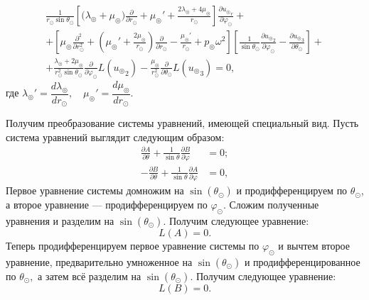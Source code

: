\begin{equation}\label{eq_3.1}
\begin{split}
\frac{1}{r_\odot\sin\theta_\odot}\left[\biggl(\lambda_\circledcirc+\mu_\circledcirc\biggr)\frac{\partial}{\partial r_\odot} + \mu_\circledcirc' + \frac{2\lambda_\circledcirc+4\mu_\circledcirc}{r_\odot}\right]\frac{\partial {u_\circledcirc}_r}{\partial\varphi_\odot} +\\
+ \left[\mu_\circledcirc\frac{\partial^2}{\partial r_\odot^2} + \left(\mu_\circledcirc'+\frac{2\mu_\circledcirc}{r_\odot}\right)\frac{\partial}{\partial r_\odot} - \frac{\mu_\circledcirc'}{r_\odot} + p_\circledcirc\omega^2\right]\left[\frac{1}{\sin\theta_\odot}\frac{\partial {u_\circledcirc}_2}{\partial\varphi_\odot} - \frac{\partial {u_\circledcirc}_3}{\partial\theta_\odot}\right] +\\
+ \frac{\lambda_\circledcirc+2\mu_\circledcirc}{r_\odot^2\sin\theta_\odot}\frac{\partial}{\partial \varphi_\odot}L({u_\circledcirc}_2) -\frac{\mu_\circledcirc}{r_\odot^2}\frac{\partial}{\partial\theta_\odot}L({u_\circledcirc}_3) = 0,
\end{split}
\end{equation}
где $\lambda_\circledcirc' = \dfrac{ d \!\lambda_\circledcirc}{ d \! r_\odot},\quad\mu_\circledcirc' = \dfrac{ d \!\mu_\circledcirc}{ d \! r_\odot}.$

Получим преобразование системы уравнений, имеющей специальный вид. Пусть система уравнений выглядит следующим образом:
\begin{equation}\label{exaple_system}
\begin{aligned}
\frac{\partial A}{\partial \theta} + \frac{1}{\sin\theta}\frac{\partial B}{\partial\varphi} &= 0;\\
- \frac{\partial B}{\partial\theta} + \frac{1}{\sin\theta}\frac{\partial A}{\partial \varphi}  &= 0,
\end{aligned}
\end{equation}
Первое уравнение системы домножим на $\sin(\theta_\odot)$ и продифференцируем по $\theta_\odot$, а второе уравнение --- продифференцируем по $\varphi_\odot.$ Сложим полученные уравнения и разделим на $\sin(\theta_\odot)$. Получим следующее уравнение:
\begin{equation*}
L(A) = 0.
\end{equation*}
Теперь продифференцируем первое уравнение системы по $\varphi_\odot$ и вычтем второе уравнение, предварительно умноженное на $\sin(\theta_\odot)$ и продифференцированное по $\theta_\odot,$ а затем всё разделим на $\sin(\theta_\odot).$ Получим следующее уравнение:
\begin{equation*}
L(B) = 0.
\end{equation*}

